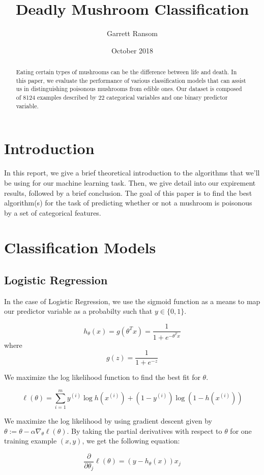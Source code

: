 \documentclass[11pt, letterpaper]{article}
\title{Deadly Mushroom Classification}
\author{Garrett Ransom}
\date{October 2018}
\begin{document}
	\maketitle
	\begin{abstract}
		\noindent
		Eating certain types of mushrooms can be the difference between life and death. In this paper, we evaluate the performance of various classification models that can assist us in distinguishing poisonous mushrooms from edible ones. Our dataset is composed of 8124 examples described by 22 categorical variables and one binary predictor variable.
	\end{abstract}

\section{Introduction}
In this report, we give a brief theoretical introduction to the algorithms that we'll be using for our machine learning task. Then, we give detail into our expirement results, followed by a brief conclusion. The goal of this paper is to find the best algorithm(s) for the task of predicting whether or not a mushroom is poisonous by a set of categorical features.


\section{Classification Models}

\subsection{Logistic Regression}
In the case of Logistic Regression, we use the sigmoid function as a means to map our predictor variable as a probabilty such that $y \in \{0, 1\}$. 

$$h_\theta(x) = g(\theta^Tx) = \frac{1}{1 + e^{-\theta^Tx}}$$ where
$$g(z) = \frac{1}{1 + e^{-z}}$$

We maximize the log likelihood function to find the best fit for $\theta$.

$$\ell(\theta) = \sum_{i=1}^{m} y^{(i)}\log h(x^{(i)}) + (1-y^{(i)})\log(1 - h(x^{(i)})) $$

We maximize the log likelihood by using gradient descent given by $\theta := \theta - \alpha\nabla_\theta \ell(\theta)$. By taking the partial derivatives with respect to $\theta$ for one training example $(x,y)$, we get the following equation:

$$\frac{\partial}{\partial \theta_j} \ell(\theta) = (y - h_\theta(x))x_j$$
\end{document}
